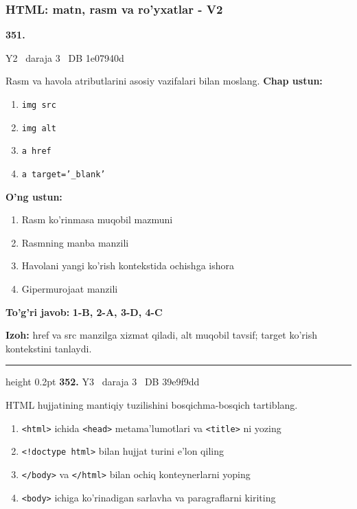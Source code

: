 \documentclass[10pt,a4paper,oneside]{article}
\begin{document}
\subsubsection{HTML: matn, rasm va ro'yxatlar - V2}
\hypertarget{q351}{\textbf{\color{ink}351.}}  {\color{muted}\scriptsize Y2 \textbullet\ daraja 3 \textbullet\ DB 1e07940d}
\par
Rasm va havola atributlarini asosiy vazifalari bilan moslang.
\textbf{\footnotesize Chap ustun:}
\begin{enumerate}[label=\arabic*),leftmargin=9mm]
\item \texttt{img src}
\item \texttt{img alt}
\item \texttt{a href}
\item \texttt{a target='\_blank'}
\end{enumerate}
\textbf{\footnotesize O'ng ustun:}
\begin{enumerate}[label=\Alph*),leftmargin=9mm]
\item Rasm ko'rinmasa muqobil mazmuni
\item Rasmning manba manzili
\item Havolani yangi ko'rish kontekstida ochishga ishora
\item Gipermurojaat manzili
\end{enumerate}
\begin{tcolorbox}[enhanced,breakable,colback=teal!4,colframe=teal!45!black,boxrule=0.45pt,arc=1.2mm,left=2.8mm,right=2.8mm,top=2mm,bottom=2mm,before skip=2mm,after skip=2mm]
\textbf{\color{teal}To'g'ri javob:} \textbf{1-B, 2-A, 3-D, 4-C}
\par\smallskip
\textbf{Izoh:} href va src manzilga xizmat qiladi, alt muqobil tavsif; target ko'rish kontekstini tanlaydi.
\end{tcolorbox}
\vspace{2mm}\hrule height 0.2pt \vspace{4mm}
\hypertarget{q352}{\textbf{\color{ink}352.}}  {\color{muted}\scriptsize Y3 \textbullet\ daraja 3 \textbullet\ DB 39e9f9dd}
\par
HTML hujjatining mantiqiy tuzilishini bosqichma-bosqich tartiblang.
\begin{enumerate}[label=\Alph*),leftmargin=9mm]
\item \texttt{\textless{}html\textgreater{}} ichida \texttt{\textless{}head\textgreater{}} metama'lumotlari va \texttt{\textless{}title\textgreater{}} ni yozing
\item \texttt{\textless{}!doctype html\textgreater{}} bilan hujjat turini e'lon qiling
\item \texttt{\textless{}/body\textgreater{}} va \texttt{\textless{}/html\textgreater{}} bilan ochiq konteynerlarni yoping
\item \texttt{\textless{}body\textgreater{}} ichiga ko'rinadigan sarlavha va paragraflarni kiriting
\end{enumerate}
\end{document}
